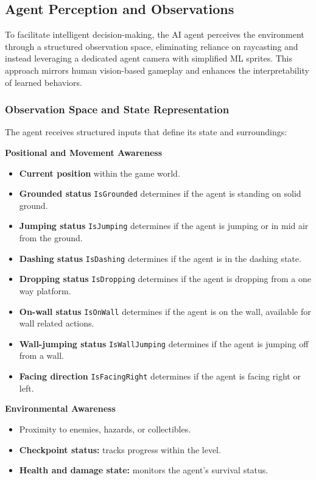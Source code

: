 \documentclass[12pt,oneside,openright,a4paper]{cpe-english-project}
\begin{document}
\subsection{Agent Perception and Observations}
To facilitate intelligent decision-making, the AI agent perceives the environment through a structured observation space, eliminating reliance on raycasting and instead leveraging a dedicated agent camera with simplified ML sprites. This approach mirrors human vision-based gameplay and enhances the interpretability of learned behaviors.
\subsubsection{Observation Space and State Representation}
The agent receives structured inputs that define its state and surroundings:\par
\textbf{Positional and Movement Awareness}
\begin{itemize}
\item  \textbf{Current position} within the game world.
\item  \textbf{Grounded status} \texttt{IsGrounded}  determines if the agent is standing on solid ground.
\item  \textbf{Jumping status} \texttt{IsJumping}  determines if the agent is jumping or in mid air from the ground.
\item  \textbf{Dashing status} \texttt{IsDashing}  determines if the agent is in the dashing state.
\item  \textbf{Dropping status} \texttt{IsDropping}  determines if the agent is dropping from a one way platform.
\item  \textbf{On-wall status} \texttt{IsOnWall}  determines if the agent is on the wall, available for wall related actions.
\item  \textbf{Wall-jumping status} \texttt{IsWallJumping}  determines if the agent is jumping off from a wall.
\item  \textbf{Facing direction} \texttt{IsFacingRight}  determines if the agent is facing right or left.
\end{itemize}
\textbf{Environmental Awareness}
\begin{itemize}
\item  Proximity to enemies, hazards, or collectibles.
\item  \textbf{Checkpoint status:} tracks progress within the level.
\item  \textbf{Health and damage state:} monitors the agent’s survival status.
\end{itemize}
\end{document}
